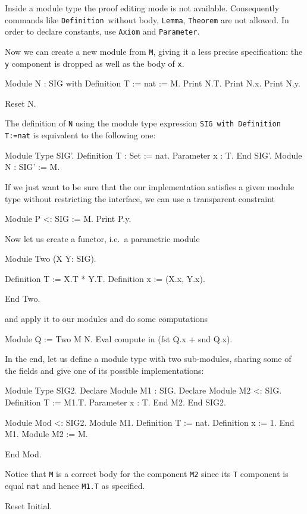 \noindent
Inside a module type the proof editing mode is not available.
Consequently commands like \texttt{Definition}\ without body,
\texttt{Lemma}, \texttt{Theorem} are not allowed.  In order to declare
constants, use \texttt{Axiom} and \texttt{Parameter}.

Now we can create a new module from \texttt{M}, giving it a less
precise specification: the \texttt{y} component is dropped as well
as the body of \texttt{x}.

\begin{coq_example}
Module N  :  SIG with Definition T := nat  :=  M.
Print N.T.
Print N.x.
Print N.y.
\end{coq_example}
\begin{coq_eval}
Reset N.
\end{coq_eval}

\noindent
The definition of \texttt{N} using the module type expression
\texttt{SIG with Definition T:=nat} is equivalent to the following
one:

\begin{coq_example*}
Module Type SIG'.
  Definition T : Set := nat.
  Parameter x : T.
End SIG'.
Module N : SIG' := M.
\end{coq_example*}
If we just want to be sure that the our implementation satisfies a
given module type without restricting the interface, we can use a
transparent constraint
\begin{coq_example}
Module P <: SIG := M.
Print P.y.
\end{coq_example}
Now let us create a functor, i.e.\ a parametric module
\begin{coq_example}
Module Two (X Y: SIG).
\end{coq_example}
\begin{coq_example*}
  Definition T := X.T * Y.T.
  Definition x := (X.x, Y.x).
\end{coq_example*}
\begin{coq_example}
End Two.
\end{coq_example}
and apply it to our modules and do some computations
\begin{coq_example}
Module Q := Two M N.
Eval compute in (fst Q.x + snd Q.x).
\end{coq_example}
In the end, let us define a module type with two sub-modules, sharing
some of the fields and give one of its possible implementations:
\begin{coq_example}
Module Type SIG2.
  Declare Module M1 : SIG.
  Declare Module M2 <: SIG.
    Definition T := M1.T.
    Parameter x : T.
  End M2.
End SIG2.
\end{coq_example}
\begin{coq_example*}
Module Mod <: SIG2.
  Module M1.
    Definition T := nat.
    Definition x := 1.
  End M1.
  Module M2 := M.
\end{coq_example*}
\begin{coq_example}
End Mod.
\end{coq_example}
Notice that \texttt{M} is a correct body for the component \texttt{M2}
since its \texttt{T} component is equal \texttt{nat} and hence
\texttt{M1.T} as specified.
\begin{coq_eval}
Reset Initial.
\end{coq_eval}

